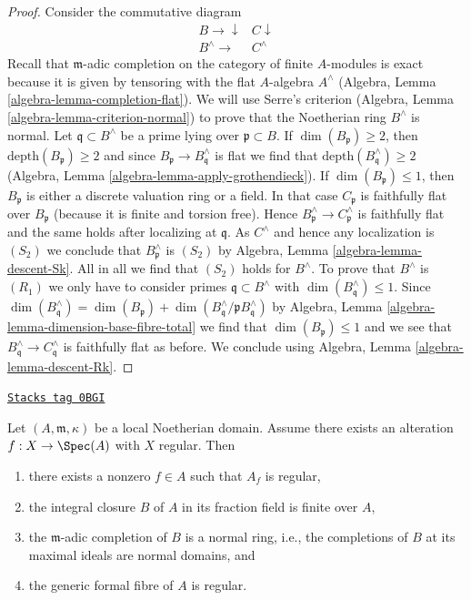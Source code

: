 \begin{proof}
Consider the commutative diagram
$$
\begin{array}{cc}B \longrightarrow\downarrow & C \downarrow \\ B^\wedge \longrightarrow & C^\wedge\end{array}
$$
Recall that $\mathfrak m$-adic completion on the category of
finite $A$-modules is exact because it is given by tensoring with
the flat $A$-algebra $A^\wedge$
(Algebra, Lemma \ref{algebra-lemma-completion-flat}).
We will use Serre's criterion
(Algebra, Lemma \ref{algebra-lemma-criterion-normal})
to prove that the Noetherian ring $B^\wedge$ is normal.
Let $\mathfrak q \subset B^\wedge$ be a prime lying over
$\mathfrak p \subset B$. If $\dim(B_\mathfrak p) \geq 2$, then
$\text{depth}(B_\mathfrak p) \geq 2$ and since
$B_\mathfrak p \to B^\wedge_\mathfrak q$ is flat we find
that $\text{depth}(B^\wedge_\mathfrak q) \geq 2$
(Algebra, Lemma \ref{algebra-lemma-apply-grothendieck}).
If $\dim(B_\mathfrak p) \leq 1$, then $B_\mathfrak p$ is
either a discrete valuation ring or a field.
In that case $C_\mathfrak p$ is faithfully flat over $B_\mathfrak p$
(because it is finite and torsion free).
Hence $B^\wedge_\mathfrak p \to C^\wedge_\mathfrak p$ is
faithfully flat and the same holds after localizing at $\mathfrak q$.
As $C^\wedge$ and hence any localization is $(S_2)$ we conclude that
$B^\wedge_\mathfrak p$ is $(S_2)$ by
Algebra, Lemma \ref{algebra-lemma-descent-Sk}.
All in all we find that
$(S_2)$ holds for $B^\wedge$. To prove that $B^\wedge$ is
$(R_1)$ we only have to consider primes $\mathfrak q \subset B^\wedge$
with $\dim(B^\wedge_\mathfrak q) \leq 1$. Since
$\dim(B^\wedge_\mathfrak q) = \dim(B_\mathfrak p) +
\dim(B^\wedge_\mathfrak q/\mathfrak p B^\wedge_\mathfrak q)$ by
Algebra, Lemma \ref{algebra-lemma-dimension-base-fibre-total}
we find that $\dim(B_\mathfrak p) \leq 1$ and
we see that $B^\wedge_\mathfrak q \to C^\wedge_\mathfrak q$
is faithfully flat as before. We conclude using
Algebra, Lemma \ref{algebra-lemma-descent-Rk}.
\end{proof}

\begin{lemma}
\label{resolve-lemma-regular-alteration-implies-local}
\href{https://stacks.math.columbia.edu/tag/0BGI}{\texttt{Stacks tag 0BGI}}

Let $(A, \mathfrak m, \kappa)$ be a local Noetherian domain.
Assume there exists an alteration $f : X \to \Spec(A)$
with $X$ regular. Then
\begin{enumerate}
\item there exists a nonzero $f \in A$ such that $A_f$ is regular,
\item the integral closure $B$ of $A$ in its fraction field is finite over $A$,
\item the $\mathfrak m$-adic completion of $B$ is a normal ring, i.e., the
completions of $B$ at its maximal ideals are normal domains, and
\item the generic formal fibre of $A$ is regular.
\end{enumerate}
\end{lemma}

